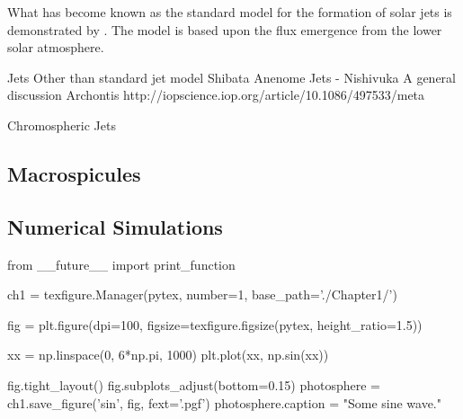
What has become known as the standard model for the formation of solar jets is demonstrated  by \cite{Shibata1992}.
The model is based upon the flux emergence from the lower solar atmosphere. 





Jets
Other than standard jet model Shibata
Anenome Jets - Nishivuka
A general discussion Archontis http://iopscience.iop.org/article/10.1086/497533/meta



Chromospheric Jets




\subsection{Macrospicules}

\subsection{Numerical Simulations}
































\begin{pycode}[chapter1]
from __future__ import print_function

ch1 = texfigure.Manager(pytex, number=1, base_path='./Chapter1/')
\end{pycode}

\begin{pycode}[chapter1]
fig = plt.figure(dpi=100, figsize=texfigure.figsize(pytex, height_ratio=1.5))

xx = np.linspace(0, 6*np.pi, 1000)
plt.plot(xx, np.sin(xx))

fig.tight_layout()
fig.subplots_adjust(bottom=0.15)
photosphere = ch1.save_figure('sin', fig, fext='.pgf')
photosphere.caption = "Some sine wave."
\end{pycode}

